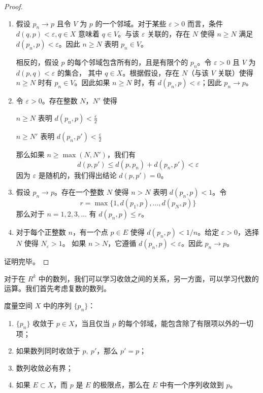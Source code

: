 \documentclass[../poma-notes.tex]{subfiles}
\begin{document}
\begin{proof}
  \begin{enumerate}[label=(\alph*)]
    \item 假设 $p_n \to p$ 且令 $V$ 为 $p$ 的一个邻域。对于某些 $\varepsilon > 0$ 而言，条件 $d(q,p)<\varepsilon,q\in X$ 意味着
          $q \in V$。与该 $\varepsilon$ 关联的，存在 $N$ 使得 $n \ge N$ 满足 $d(p_n,p) < \varepsilon$。因此 $n \ge N$ 表明
          $p_n \in V$。

          相反的，假设 $p$ 的每个邻域包含所有的，且是有限个的 $p_n$。令 $\varepsilon > 0$ 且 $V$ 为 $d(p,q)<\varepsilon$ 的集合，
          其中 $q \in X$。根据假设，存在 $N$（与该 $V$ 关联）使得 $n \ge N$ 时有 $p_n \in V$。因此如果 $n \ge N$ 时，有
          $d(p_n,p) < \varepsilon$；因此 $p_n \to p$。
    \item 令 $\varepsilon > 0$。存在整数 $N$，$N'$ 使得
          \begin{center}
            $n \ge N $ 表明 $d(p_n,p)<\frac{\varepsilon}{2}$
          \end{center}
          \begin{center}
            $n \ge N' $ 表明 $d(p_n,p')<\frac{\varepsilon}{2}$
          \end{center}
          那么如果 $n \ge \max(N, N')$，我们有
          \[d(p,p') \le d(p,p_n) + d(p_n,p') < \varepsilon\]
          因为 $\varepsilon$ 是随机的，我们得出结论 $d(p,p') = 0$。
    \item 假设 $p_n \to p$。存在一个整数 $N$ 使得 $n > N$ 表明 $d(p_n,p) < 1$。令
          \[r = \max \{1, d(p_1,p), \dots, d(p_N,p)\}\]
          那么对于 $n=1,2,3,\dots$ 有 $d(p_n, p) \le r$。
    \item 对于每个正整数 $n$，有一个点 $p \in E$ 使得 $d(p_n,p)<1/n$。给定 $\varepsilon>0$，选择 $N$ 使得 $N_{\varepsilon}>1$。
          如果 $n > N$，它遵循 $d(p_n,p) < \varepsilon$。因此 $p_n \to p$。
  \end{enumerate}
  证明完毕。
\end{proof}

对于在 $R^k$ 中的数列，我们可以学习收敛之间的关系，另一方面，可以学习代数的运算。我们首先考虑复数的数列。

\begin{anote}
  度量空间 $X$ 中的序列 $\{p_n\}$：
  \begin{enumerate}[label=(\alph*)]
    \item $\{p_n\}$ 收敛于 $p \in X$，当且仅当 $p$ 的每个邻域，能包含除了有限项以外的一切项；
    \item 如果数列同时收敛于 $p,\ p'$，那么 $p' = p$；
    \item 数列收敛必有界；
    \item 如果 $E \subset X$，而 $p$ 是 $E$ 的极限点，那么在 $E$ 中有一个序列收敛到 $p$。
  \end{enumerate}
\end{anote}
\end{document}
